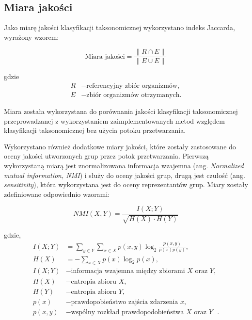     \subsection{Miara jakości}

        Jako miarę jakości klasyfikacji taksonomicznej wykorzystano indeks Jaccarda, wyrażony wzorem:

        \begin{equation}
            \text{Miara jakości} = \frac{\| R \cap E \|}{\| E \cup E \|}
        \end{equation}

        gdzie 
        \begin{align*}
            R &- \text{referencyjny zbiór organizmów,} \\
            E &- \text{zbiór organizmów otrzymanych.}
        \end{align*}

        Miara została wykorzystana do porównania jakości klasyfikacji taksonomicznej przeprowadzanej z wykorzystaniem zaimplementowanych metod względem klasyfikacji taksonomicznej bez użycia potoku przetwarzania.

        Wykorzystano również dodatkowe miary jakości, które zostały zastosowane do oceny jakości utworzonych grup przez potok przetwarzania. Pierwszą wykorzystaną miarą jest znormalizowana informacja wzajemna (ang. \textit{Normalized mutual information, NMI}) i służy do oceny jakości grup, drugą jest czułość (ang. \textit{sensitivity}), która wykorzystana jest do oceny reprezentantów grup. Miary zostały zdefiniowane odpowiednio wzorami:

        \begin{equation}
            NMI(X, Y) = \frac{I(X; Y)}{\sqrt{H(X) \cdot H(Y)}}
        \end{equation}

        gdzie,
        \begin{align*}
            I(X; Y) &= \sum_{y \in Y}{ \sum_{x \in X}{p(x, y) \log_{2}{\frac{p(x, y)}{p(x) p(y)}}}}, \\
            H(X) &= - \sum_{x \in X}{ p(x) \log_{2}{p(x)}}, \\
            I(X; Y) &- \text{informacja wzajemna między zbiorami $X$ oraz $Y$}, \\
            H(X) &- \text{entropia zbioru $X$}, \\
            H(Y) &- \text{entropia zbioru $Y$}, \\
            p(x) &- \text{prawdopobieństwo zajścia zdarzenia $x$}, \\
            p(x, y) &- \text{wspólny rozkład prawdopodobieństwa $X$ oraz $Y$ }.
        \end{align*}

